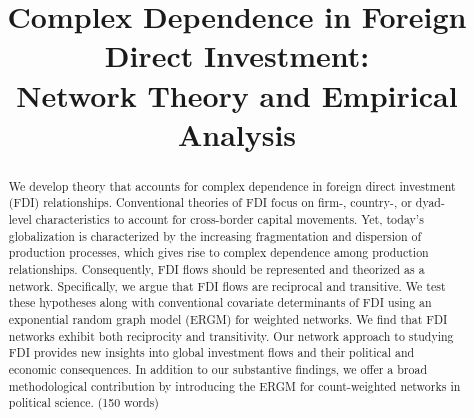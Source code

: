 \documentclass[reqno,onecolumn,letterpaper,12pt]{article}
\begin{document}
\title{Complex Dependence in Foreign Direct Investment: \\Network Theory and Empirical Analysis} %
\date{}
\maketitle

\thispagestyle{empty}
\singlespacing
\begin{abstract}
    \noindent We develop theory that accounts for complex dependence in foreign direct investment (FDI) relationships. Conventional theories of FDI focus on firm-, country-, or dyad-level characteristics to account for cross-border capital movements. Yet, today's globalization is characterized by the increasing fragmentation and dispersion of production processes, which gives rise to complex dependence among production relationships. Consequently, FDI flows should be represented and theorized as a network. Specifically, we argue that FDI flows are reciprocal and transitive. We test these hypotheses along with conventional covariate determinants of FDI using an exponential random graph model (ERGM) for weighted networks. We find that FDI networks exhibit both reciprocity and transitivity. Our network approach to studying FDI provides new insights into global investment flows and their political and economic consequences. In addition to our substantive findings, we offer a broad methodological contribution by introducing the ERGM for count-weighted networks in political science. (150 words)



\end{abstract}
~\\
\end{document}
